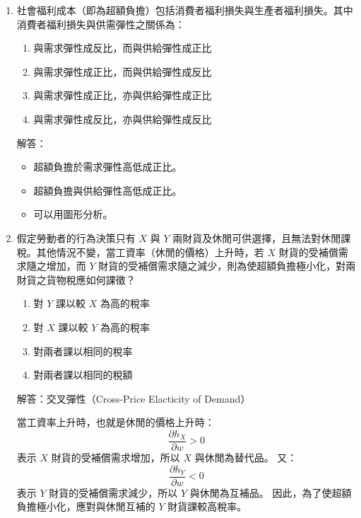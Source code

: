 \documentclass[12pt, a4paper]{article}
\begin{document}
\begin{enumerate}
    \item 社會福利成本（即為超額負擔）包括消費者福利損失與生產者福利損失。其中消費者福利損失與供需彈性之關係為：
    \begin{enumerate}[label=\Alph*.]
        \item 與需求彈性成反比，而與供給彈性成正比
        \item 與需求彈性成正比，而與供給彈性成反比
        \item 與需求彈性成正比，亦與供給彈性成正比
        \item 與需求彈性成反比，亦與供給彈性成反比
    \end{enumerate}
    解答：
    \begin{itemize}
        \item 超額負擔於需求彈性高低成正比。
        \item 超額負擔與供給彈性高低成正比。
        \item 可以用圖形分析。
    \end{itemize}

    \item 假定勞動者的行為決策只有 \(X\) 與 \(Y\) 兩財貨及休閒可供選擇，且無法對休閒課稅。其他情況不變，當工資率（休閒的價格）上升時，若 \(X\) 財貨的受補償需求隨之增加，而 \(Y\) 財貨的受補償需求隨之減少，則為使超額負擔極小化，對兩財貨之貨物稅應如何課徵？
    \begin{enumerate}[label=\Alph*.]
        \item 對 \(Y\) 課以較 \(X\) 為高的稅率
        \item 對 \(X\) 課以較 \(Y\) 為高的稅率
        \item 對兩者課以相同的稅率
        \item 對兩者課以相同的稅額
    \end{enumerate}
    解答：交叉彈性（Cross-Price Elacticity of Demand）

    當工資率上升時，也就是休閒的價格上升時：
    \[
    \frac{\partial h_X}{\partial w} > 0
    \]
    表示 \(X\) 財貨的受補償需求增加，所以 \(X\) 與休閒為替代品。
    又：
    \[
    \frac{\partial h_Y}{\partial w} < 0
    \]
    表示 \(Y\) 財貨的受補償需求減少，所以 \(Y\) 與休閒為互補品。
    因此，為了使超額負擔極小化，應對與休閒互補的 \(Y\) 財貨課較高稅率。


\end{enumerate}
\end{document}

